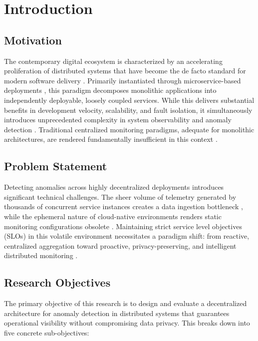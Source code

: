 \chapter{Introduction}
\label{ch:introduction}

\section{Motivation}
\label{sec:motivation}

The contemporary digital ecosystem is characterized by an accelerating proliferation
of distributed systems that have become the de facto standard for modern software
delivery \cite{coulouris2011distributed}. Primarily instantiated through
microservice-based deployments \cite{newman2015building, dragoni2017microservices},
this paradigm decomposes monolithic applications into independently deployable,
loosely coupled services. While this delivers substantial benefits in development
velocity, scalability, and fault isolation, it simultaneously introduces
unprecedented complexity in system observability and anomaly detection
\cite{kalloniatis2020microservices_observability}. Traditional centralized monitoring
paradigms, adequate for monolithic architectures, are rendered fundamentally
insufficient in this context \cite{lin2018aiops}.

\section{Problem Statement}
\label{sec:problem_statement}

Detecting anomalies across highly decentralized deployments introduces significant
technical challenges. The sheer volume of telemetry generated by thousands of
concurrent service instances creates a data ingestion bottleneck
\cite{sigelman2010dapper}, while the ephemeral nature of cloud-native environments
renders static monitoring configurations obsolete \cite{lin2018aiops}. Maintaining
strict service level objectives (SLOs) in this volatile environment necessitates a
paradigm shift: from reactive, centralized aggregation toward proactive,
privacy-preserving, and intelligent distributed monitoring \cite{lin2018aiops}.

\section{Research Objectives}
\label{sec:research_objectives}

The primary objective of this research is to design and evaluate a decentralized
architecture for anomaly detection in distributed systems that guarantees operational
visibility without compromising data privacy. This breaks down into five concrete
sub-objectives:

